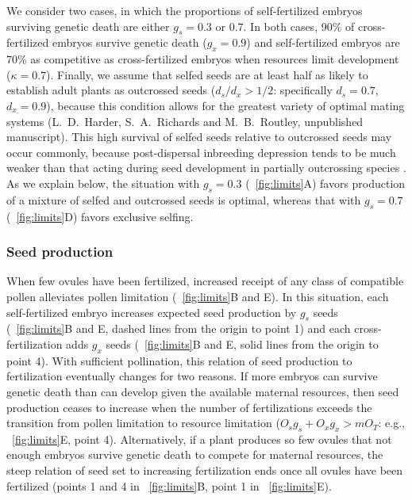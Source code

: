 \documentclass[letterpaper,titlepage]{scrartcl}
\newcommand{\OFMixedMating}{L.~D.~Harder, S.~A.~Richards and
  M.~B.~Routley, unpublished manuscript}
\begin{document}
We consider two cases, in which the proportions of self-fertilized
embryos surviving genetic death are either $g_{s}=0.3$ or 0.7. In both
cases, 90\% of cross-fertilized embryos survive genetic death
($g_{x}=0.9$) and self-fertilized embryos are 70\% as competitive as
cross-fertilized embryos when resources limit development ($\kappa
=0.7$). Finally, we assume that selfed seeds are at least half as
likely to establish adult plants as outcrossed seeds
($d_{s}/d_{x}>1/2$: specifically $d_{s}=0.7$, $d_{x}=0.9$), because
this condition allows for the greatest variety of optimal mating
systems ({\OFMixedMating}). This high survival of selfed seeds
relative to outcrossed seeds may occur commonly, because
post-dispersal inbreeding depression tends to be much weaker than that
acting during seed development in partially outcrossing species
\citep{Husband96}. As we explain below, the situation with $g_{s}=0.3$
({\fref}~\ref{fig:limits}A) favors production of a mixture of selfed
and outcrossed seeds is optimal, whereas that with $g_{s}=0.7$
({\fref}~\ref{fig:limits}D) favors exclusive selfing.

\subsubsection{Seed production}
When few ovules have been fertilized, increased receipt of any class
of compatible pollen alleviates pollen limitation
({\fref}~\ref{fig:limits}B and E). In this situation, each
self-fertilized embryo increases expected seed production by $g_{s}$
seeds ({\fref}~\ref{fig:limits}B and E, dashed lines from the origin
to point 1) and each cross-fertilization adds $g_{x}$ seeds
({\fref}~\ref{fig:limits}B and E, solid lines from the origin to point
4). With sufficient pollination, this relation of seed production to
fertilization eventually changes for two reasons. If more embryos can
survive genetic death than can develop given the available maternal
resources, then seed production ceases to increase when the number of
fertilizations exceeds the transition from pollen limitation to
resource limitation ($O_{s}g_{s}+O_{x}g_{x}>mO_{T}$: e.g.,
{\fref}~\ref{fig:limits}E, point 4). Alternatively, if a plant
produces so few ovules that not enough embryos survive genetic death
to compete for maternal resources, the steep relation of seed set to
increasing fertilization ends once all ovules have been fertilized
(points 1 and 4 in {\fref}~\ref{fig:limits}B, point 1 in
{\fref}~\ref{fig:limits}E).
\end{document}
